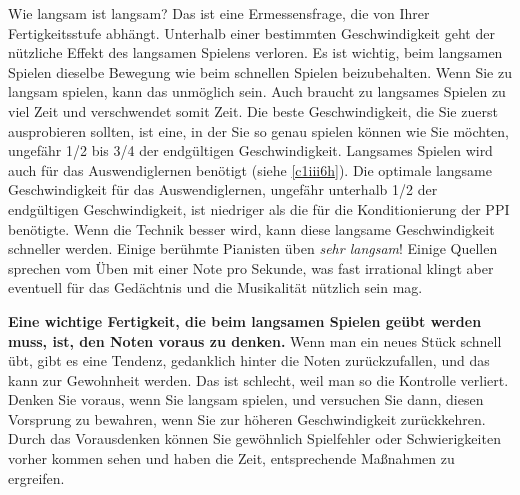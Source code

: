 Wie langsam ist langsam?
Das ist eine Ermessensfrage, die von Ihrer Fertigkeitsstufe abhängt.
Unterhalb einer bestimmten Geschwindigkeit geht der nützliche Effekt des langsamen Spielens verloren.
Es ist wichtig, beim langsamen Spielen dieselbe Bewegung wie beim schnellen Spielen beizubehalten.
Wenn Sie zu langsam spielen, kann das unmöglich sein.
Auch braucht zu langsames Spielen zu viel Zeit und verschwendet somit Zeit.
Die beste Geschwindigkeit, die Sie zuerst ausprobieren sollten, ist eine, in der Sie so genau spielen können wie Sie möchten, ungefähr 1/2 bis 3/4 der endgültigen Geschwindigkeit.
Langsames Spielen wird auch für das Auswendiglernen benötigt (siehe \hyperref[c1iii6h]{\ref*{c1iii6h}}).
Die optimale langsame Geschwindigkeit für das Auswendiglernen, ungefähr unterhalb 1/2 der endgültigen Geschwindigkeit, ist niedriger als die für die Konditionierung der PPI benötigte.
Wenn die Technik besser wird, kann diese langsame Geschwindigkeit schneller werden.
Einige berühmte Pianisten üben \textit{sehr langsam}!
Einige Quellen sprechen vom Üben mit einer Note pro Sekunde, was fast irrational klingt aber eventuell für das Gedächtnis und die Musikalität nützlich sein mag.

\textbf{Eine wichtige Fertigkeit, die beim langsamen Spielen geübt werden muss, ist, den Noten voraus zu denken.}
Wenn man ein neues Stück schnell übt, gibt es eine Tendenz, gedanklich hinter die Noten zurückzufallen, und das kann zur Gewohnheit werden.
Das ist schlecht, weil man so die Kontrolle verliert.
Denken Sie voraus, wenn Sie langsam spielen, und versuchen Sie dann, diesen Vorsprung zu bewahren, wenn Sie zur höheren Geschwindigkeit zurückkehren.
Durch das Vorausdenken können Sie gewöhnlich Spielfehler oder Schwierigkeiten vorher kommen sehen und haben die Zeit, entsprechende Maßnahmen zu ergreifen.



